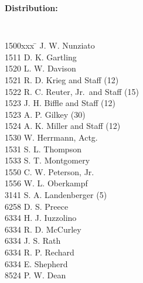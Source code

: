 \cleardoublepage
%
%
\twocolumn %
%
{\bf Distribution:}
\par
%
{\tt %
\begin{tabbing}
1500xxx \=  \> J. W. Nunziato \\
1511 \> D. K. Gartling \\
1520 \> L. W. Davison \\
1521 \> R. D. Krieg and Staff (12) \\
1522 \> R. C. Reuter, Jr.\ and Staff (15) \\
1523 \> J. H. Biffle and Staff (12) \\
1523 \> A. P. Gilkey (30) \\
1524 \> A. K. Miller and Staff (12) \\
1530 \> W. Herrmann, Actg. \\
1531 \> S. L. Thompson \\
1533 \> S. T. Montgomery \\
1550 \> C. W. Peterson, Jr.\ \\
1556 \> W. L. Oberkampf \\
3141 \> S. A. Landenberger (5) \\
6258 \> D. S. Preece \\
6334 \> H. J. Iuzzolino \\
6334 \> R. D. McCurley \\
6334 \> J. S. Rath \\
6334 \> R. P. Rechard \\
6334 \> E. Shepherd \\
8524 \> P. W. Dean \\
\end{tabbing}
}
%
